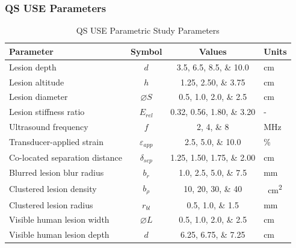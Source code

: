 \documentclass{beamer}
\newcommand{\percent}{\%}
\begin{document}
		\begin{frame}[label=qsParameters]
			\frametitle{QS USE Parameters}
			\centering
			\scriptsize
			\begin{table}
				\caption{QS USE Parametric Study Parameters}
				\begin{tabular}{lccs[table-unit-alignment = left]}
					\toprule
					Parameter & Symbol & Values & Units \\
					\midrule
					Lesion depth & $d$ & \numlist{3.5;6.5;8.5;10.0} & \si{\cm} \\
					Lesion altitude & $h$ & \numlist{1.25;2.50;3.75} & \si{\cm} \\
					Lesion diameter & $\diameter S$ & \numlist{0.5;1.0;2.0;2.5} & \si{\cm} \\
					Lesion stiffness ratio & $E_{rel}$ & \numlist{0.32;0.56;1.80;3.20} & - \\
					Ultrasound frequency & $f$ & \numlist{2;4;8} & \si{\MHz} \\
					Transducer-applied strain & $\varepsilon_{app}$ & \numlist{2.5;5.0;10.0} & \si{\percent} \\
					Co-located separation distance & $\delta_{sep}$ & \numlist{1.25;1.50;1.75;2.00} & \si{\cm} \\
					Blurred lesion blur radius & $b_r$ & \numlist{1.0;2.5;5.0;7.5} & \si{\mm} \\
					Clustered lesion density & $b_\rho$ & \numlist{10;20;30;40} & \si{\per\cm\squared} \\
					Clustered lesion radius & $r_{bl}$ & \numlist{0.5;1.0;1.5} & \si{\mm} \\
					Visible human lesion width & $\diameter L$ & \numlist{0.5;1.0;2.0;2.5} & \si{\cm} \\
					Visible human lesion depth & $d$ & \numlist{6.25;6.75;7.25} & \si{\cm} \\
					\bottomrule
				\end{tabular}
			\end{table}
		\end{frame}
\end{document}
